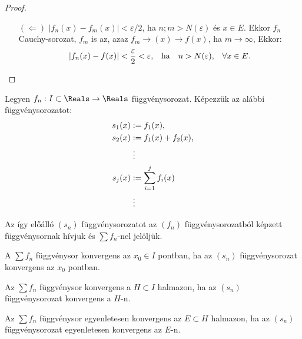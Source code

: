 \begin{theorem}
\begin{proof}
\begin{itemize}
      \item[$(\Leftarrow)$] $|f_n(x) - f_m(x)| < \varepsilon / 2$,
            ha $n; m > N(\varepsilon)$ és $x \in E$. Ekkor $f_n$ Cauchy-sorozat,
            $f_m$ is az, azaz $f_m \rightarrow(x) \to f(x)$, ha $m \to \infty$,
            Ekkor:
            $$
              |f_n(x) - f(x)| < \frac{\varepsilon}{2} < \varepsilon
              \text, \quad \text{ha} \quad
              n > N(\varepsilon)
              \text, \quad
              \forall x \in E.
            $$
    \end{itemize}
  \end{proof}
\end{theorem}

\begin{definition}[Függvénysor]
  Legyen $f_n : I \subset \Reals \to \Reals$ függvénysorozat. Képezzük az
  alábbi függvénysorozatot:
  \begin{align*}
    s_1(x) & := f_1(x)
    \text,                              \\
    s_2(x) & := f_1(x) + f_2(x)
    \text,                              \\
           & \phantom{:} \vdots
    \\
    s_j(x) & := \sum_{i = 1}^{j} f_i(x)
    \\
           & \phantom{:} \vdots
  \end{align*}

  Az így előálló $(s_n)$ függvénysorozatot az $(f_n)$ függvénysorozatból képzett
  függvénysornak hívjuk és $\sum f_n$-nel jelöljük.
\end{definition}

\begin{definition}
  A $\sum f_n$ függvénysor konvergens az $x_0 \in I$ pontban, ha az $(s_n)$
  függvénysorozat konvergens az $x_0$ pontban.
\end{definition}

\begin{definition}
  Az $\sum f_n$ függvénysor konvergens a $H \subset I$ halmazon, ha az
  $(s_n)$ függvénysorozat konvergens a $H$-n.
\end{definition}

\begin{definition}
  Az $\sum f_n$ függvénysor egyenletesen konvergens az $E \subset H$
  halmazon, ha az $(s_n)$ függvénysorozat egyenletesen konvergens az $E$-n.
\end{definition}

